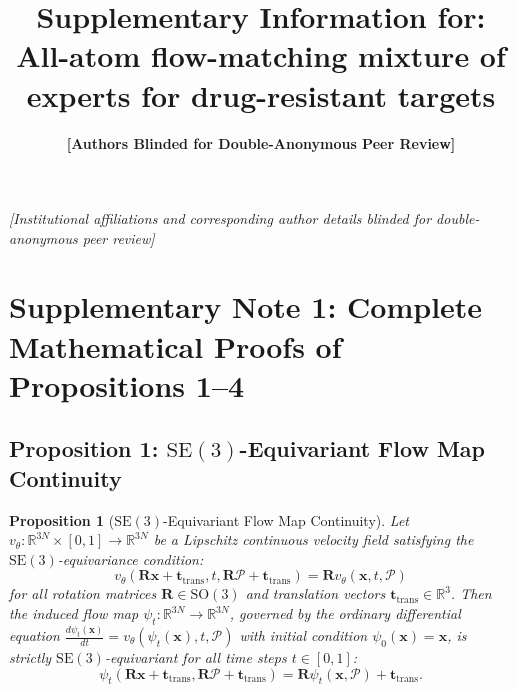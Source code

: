 \documentclass[11pt,a4paper]{article}
\title{\textbf{Supplementary Information for:\\All-atom flow-matching mixture of experts for drug-resistant targets}}
\author{
    \normalsize
    \textbf{[Authors Blinded for Double-Anonymous Peer Review]}
}
\date{}
\newtheorem{proposition}{Proposition}
\begin{document}
\maketitle

\begin{center}
\footnotesize
\textit{[Institutional affiliations and corresponding author details blinded for double-anonymous peer review]}
\end{center}

\vspace{1em}

\tableofcontents

\newpage

\section*{Supplementary Note 1: Complete Mathematical Proofs of Propositions 1--4}

\subsection*{Proposition 1: $\mathrm{SE}(3)$-Equivariant Flow Map Continuity}
\begin{proposition}[$\mathrm{SE}(3)$-Equivariant Flow Map Continuity]
Let $v_\theta: \mathbb{R}^{3N} \times [0, 1] \to \mathbb{R}^{3N}$ be a Lipschitz continuous velocity field satisfying the $\mathrm{SE}(3)$-equivariance condition:
\begin{equation}
v_\theta(\mathbf{R}\mathbf{x} + \mathbf{t}_{\text{trans}}, t, \mathbf{R}\mathcal{P} + \mathbf{t}_{\text{trans}}) = \mathbf{R} v_\theta(\mathbf{x}, t, \mathcal{P})
\end{equation}
for all rotation matrices $\mathbf{R} \in \mathrm{SO}(3)$ and translation vectors $\mathbf{t}_{\text{trans}} \in \mathbb{R}^3$. Then the induced flow map $\psi_t: \mathbb{R}^{3N} \to \mathbb{R}^{3N}$, governed by the ordinary differential equation $\frac{d\psi_t(\mathbf{x})}{dt} = v_\theta(\psi_t(\mathbf{x}), t, \mathcal{P})$ with initial condition $\psi_0(\mathbf{x}) = \mathbf{x}$, is strictly $\mathrm{SE}(3)$-equivariant for all time steps $t \in [0, 1]$:
\begin{equation}
\psi_t(\mathbf{R}\mathbf{x} + \mathbf{t}_{\text{trans}}, \mathbf{R}\mathcal{P} + \mathbf{t}_{\text{trans}}) = \mathbf{R} \psi_t(\mathbf{x}, \mathcal{P}) + \mathbf{t}_{\text{trans}}.
\end{equation}
\end{proposition}
\end{document}

